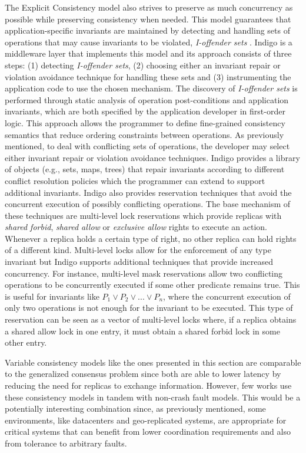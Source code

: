The Explicit Consistency model also strives to preserve as much concurrency as possible while preserving consistency when needed. This model guarantees that application-specific invariants are maintained by detecting and handling sets of operations that may cause invariants to be violated, \textit{I-offender sets} \cite{Balegas2015}. Indigo is a middleware layer that implements this model and its approach consists of three steps: (1) detecting \textit{I-offender sets}, (2) choosing either an invariant repair or violation avoidance technique for handling these sets and (3) instrumenting the application code to use the chosen mechanism. The discovery of \textit{I-offender sets} is performed through static analysis of operation post-conditions and application invariants, which are both specified by the application developer in first-order logic. This approach allows the programmer to define fine-grained consistency semantics that reduce ordering constraints between operations. As previously mentioned, to deal with conflicting sets of operations, the developer may select either invariant repair or violation avoidance techniques. Indigo provides a library of objects (e.g., sets, maps, trees) that repair invariants according to different conflict resolution policies which the programmer can extend to support additional invariants. Indigo also provides reservation techniques that avoid the concurrent execution of possibly conflicting operations. The base mechanism of these techniques are multi-level lock reservations which provide replicas with \textit{shared forbid}, \textit{shared allow} or \textit{exclusive allow} rights to execute an action. Whenever a replica holds a certain type of right, no other replica can hold rights of a different kind. Multi-level locks allow for the enforcement of any type invariant but Indigo supports additional techniques that provide increased concurrency. For instance, multi-level mask reservations allow two conflicting operations to be concurrently executed if some other predicate remains true. This is useful for invariants like $P_1 \vee P_2 \vee ... \vee P_n$, where the concurrent execution of only two operations is not enough for the invariant to be executed. This type of reservation can be seen as a vector of multi-level locks where, if a replica obtains a shared allow lock in one entry, it must obtain a shared forbid lock in some other entry. \par
Variable consistency models like the ones presented in this section are comparable to the generalized consensus problem since both are able to lower latency by reducing the need for replicas to exchange information. However, few works use these consistency models in tandem with non-crash fault models. This would be a potentially interesting combination since, as previously mentioned, some environments, like datacenters and geo-replicated systems, are appropriate for critical systems that can benefit from lower coordination requirements and also from tolerance to arbitrary faults.

